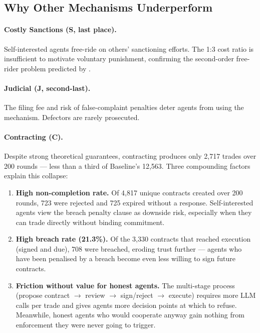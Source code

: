 \documentclass{article}
\begin{document}
\subsection{Why Other Mechanisms Underperform}

\paragraph{Costly Sanctions (S, last place).} Self-interested agents free-ride on others' sanctioning efforts. The 1:3 cost ratio is insufficient to motivate voluntary punishment, confirming the second-order free-rider problem predicted by \citet{piedrahita2025}.

\paragraph{Judicial (J, second-last).} The filing fee and risk of false-complaint penalties deter agents from using the mechanism. Defectors are rarely prosecuted.

\paragraph{Contracting (C).} Despite strong theoretical guarantees, contracting produces only 2,717 trades over 200 rounds --- less than a third of Baseline's 12,563. Three compounding factors explain this collapse:

\begin{enumerate}
  \item \textbf{High non-completion rate.} Of 4,817 unique contracts created over 200 rounds, 723 were rejected and 725 expired without a response. Self-interested agents view the breach penalty clause as downside risk, especially when they can trade directly without binding commitment.
  \item \textbf{High breach rate (21.3\%).} Of the 3,330 contracts that reached execution (signed and due), 708 were breached, eroding trust further --- agents who have been penalised by a breach become even less willing to sign future contracts.
  \item \textbf{Friction without value for honest agents.} The multi-stage process (propose contract $\to$ review $\to$ sign/reject $\to$ execute) requires more LLM calls per trade and gives agents more decision points at which to refuse. Meanwhile, honest agents who would cooperate anyway gain nothing from enforcement they were never going to trigger.
\end{enumerate}
\end{document}
